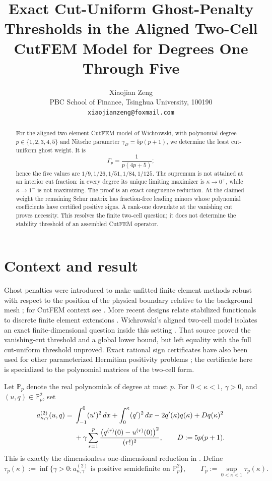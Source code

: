 \documentclass[11pt]{article}
\title{Exact Cut-Uniform Ghost-Penalty Thresholds in the Aligned
Two-Cell CutFEM Model for Degrees One Through Five}
\author{Xiaojian Zeng\\
\small PBC School of Finance, Tsinghua University, 100190\\
\small \texttt{xiaojianzeng@foxmail.com}}
\date{}
\newcommand{\PP}{\mathbb P}
\begin{document}
\maketitle

\begin{abstract}
For the aligned two-element CutFEM model of Wichrowski, with polynomial
degree $p\in\{1,2,3,4,5\}$ and Nitsche parameter
$\gamma_D=5p(p+1)$, we determine the least cut-uniform ghost weight.
It is
\[
 \Gamma_p=\frac{1}{p(4p+5)};
\]
hence the five values are $1/9,1/26,1/51,1/84,1/125$.  The supremum is
not attained at an interior cut fraction: in every degree its unique
limiting maximizer is $\kappa\to0^+$, while $\kappa\to1^-$ is not
maximizing.  The proof is an exact congruence reduction.  At the claimed
weight the remaining Schur matrix has fraction-free leading minors whose
polynomial coefficients have certified positive signs.  A rank-one
downdate at the vanishing cut proves necessity.  This resolves the finite
two-cell question; it does not determine the stability threshold of an
assembled CutFEM operator.
\end{abstract}

\section{Context and result}

Ghost penalties were introduced to make unfitted finite element methods
robust with respect to the position of the physical boundary relative to
the background mesh \citep{Burman2010}; for CutFEM context see
\citet{BurmanEtAl2015}.  More recent designs relate stabilized functionals
to discrete finite element extensions \citep{BurmanHansboLarson2026}.
Wichrowski's aligned two-cell model isolates an exact finite-dimensional
question inside this setting \citep[Proposition~5 and Appendix~B]
{Wichrowski2026}.  That source proved the vanishing-cut threshold and a
global lower bound, but left equality with the full cut-uniform threshold
unproved.  Exact rational sign certificates have also been used for other
parameterized Hermitian positivity problems \cite{ZengEtAl2026}; the
certificate here is specialized to the polynomial matrices of the
two-cell form.

Let $\PP_p$ denote the real polynomials of degree at most $p$.  For
$0<\kappa<1$, $\gamma>0$, and $(u,q)\in\PP_p^2$, set
\begin{align}
a^{(2)}_{\kappa,\gamma}(u,q)
={}&\int_{-1}^{0}(u')^2\,dx+\int_0^\kappa(q')^2\,dx
-2q'(\kappa)q(\kappa)+Dq(\kappa)^2 \notag\\
&+\gamma\sum_{r=1}^p
 \frac{\bigl(q^{(r)}(0)-u^{(r)}(0)\bigr)^2}{(r!)^2},
 \qquad D:=5p(p+1).                                      \label{eq:form}
\end{align}
This is exactly the dimensionless one-dimensional reduction in
\citet[Eq.~(60)]{Wichrowski2026}.  Define
\[
 \tau_p(\kappa):=\inf\{\gamma>0:
 a^{(2)}_{\kappa,\gamma}\text{ is positive semidefinite on }\PP_p^2\},
 \qquad
 \Gamma_p:=\sup_{0<\kappa<1}\tau_p(\kappa).
\]
\end{document}
